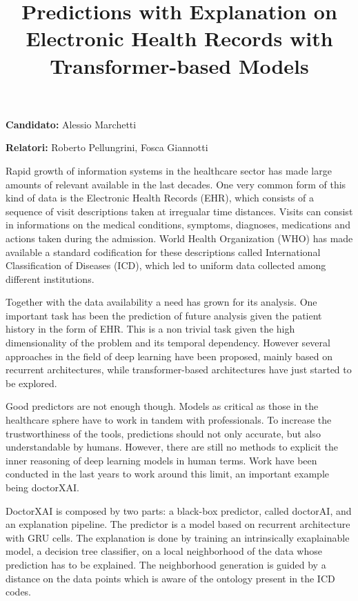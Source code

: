\documentclass[]{marticle}
\title{\textbf{\huge Predictions with Explanation on Electronic Health Records with Transformer-based Models}}
\date{}
\author{}
\begin{document}
\maketitle

\textbf{Candidato:} Alessio Marchetti

\textbf{Relatori:} Roberto Pellungrini, Fosca Giannotti
\vspace{0.4cm}

Rapid growth of information systems in the healthcare sector has made large amounts of relevant
available in the last decades. One very common form of this kind of data is the Electronic Health
Records (EHR), which consists of a sequence of visit descriptions taken at irregualar time
distances. Visits can consist in informations on the medical conditions, symptoms, diagnoses,
medications and actions taken during the admission. World Health Organization (WHO) has made
available a standard codification for these descriptions called International Classification of
Diseases (ICD), which led to uniform data collected among different institutions.

Together with the data availability a need has grown for its analysis. One important task has been
the prediction of future analysis given the patient history in the form of EHR. This is a non
trivial task given the high dimensionality of the problem and its temporal dependency. However
several approaches in the field of deep learning have been proposed, mainly based on recurrent
architectures, while transformer-based architectures have just started to be explored.

Good predictors are not enough though. Models as critical as those in the healthcare sphere have to
work in tandem with professionals. To increase the trustworthiness of the tools, predictions should
not only accurate, but also understandable by humans. However, there are still no methods to explicit
the inner reasoning of deep learning models in human terms. Work have been conducted in the last
years to work around this limit, an important example being doctorXAI. 

DoctorXAI is composed by two parts: a black-box predictor, called doctorAI, and an explanation
pipeline. The predictor is a model based on recurrent architecture with GRU cells. The explanation
is done by training an intrinsically exaplainable model, a decision tree classifier, on a local
neighborhood of the data whose prediction has to be explained. The neighborhood generation is guided
by a distance on the data points which is aware of the ontology present in the ICD codes.
\end{document}
